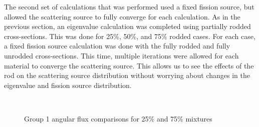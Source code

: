 The second set of calculations that was performed used a fixed fission source, but allowed the scattering source to fully converge for each calculation.  As in the previous section, an eigenvalue calculation was completed using partially rodded cross-sections.  This was done for 25\%, 50\%, and 75\% rodded cases.  For each case, a fixed fission source calculation was done with the fully rodded and fully unrodded cross-sections.  This time, multiple iterations were allowed for each material to converge the scattering source.  This allows us to see the effects of the rod on the scattering source distribution without worrying about changes in the eigenvalue and fission source distribution.

\begin{figure}[H]
  \centering
  \hfill
  ~
  \caption{Group 1 angular flux comparisons for 25\% and 75\% mixtures}\label{f:1dmoc-angflux1}
\end{figure}



